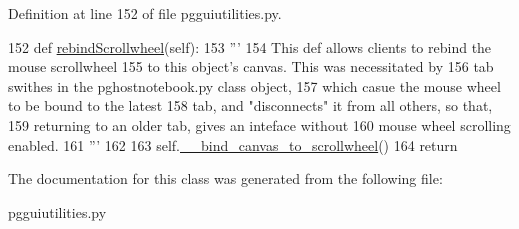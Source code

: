 Definition at line 152 of file pgguiutilities.\+py.


\begin{DoxyCode}
152     \textcolor{keyword}{def }\hyperlink{classnegui_1_1pgguiutilities_1_1FrameContainerScrolled_afcc54f75cc509614a3d265d6578cc147}{rebindScrollwheel}(self):
153         \textcolor{stringliteral}{'''}
154 \textcolor{stringliteral}{        This def allows clients to rebind the mouse scrollwheel}
155 \textcolor{stringliteral}{        to this object's canvas.  This was necessitated by}
156 \textcolor{stringliteral}{        tab swithes in the pghostnotebook.py class object,}
157 \textcolor{stringliteral}{        which casue the mouse wheel to be bound to the latest}
158 \textcolor{stringliteral}{        tab, and "disconnects" it from all others, so that,}
159 \textcolor{stringliteral}{        returning to an older tab, gives an inteface without}
160 \textcolor{stringliteral}{        mouse wheel scrolling enabled.}
161 \textcolor{stringliteral}{        '''}
162 
163         self.\hyperlink{classnegui_1_1pgguiutilities_1_1FrameContainerScrolled_a4d43cdbefdf2cb397141a0a74a87c629}{\_\_bind\_canvas\_to\_scrollwheel}()
164         \textcolor{keywordflow}{return}
\end{DoxyCode}


The documentation for this class was generated from the following file\+:\begin{DoxyCompactItemize}
\item 
pgguiutilities.\+py\end{DoxyCompactItemize}
